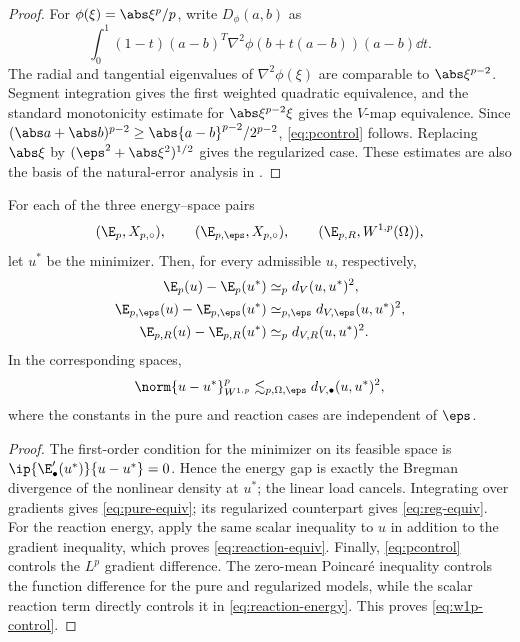 \begin{proof}
For \(\phi(\xi)=\abs\xi^p/p\), write \(D_\phi(a,b)\) as
\[
 \int_0^1(1-t)(a-b)^T\nabla^2\phi(b+t(a-b))(a-b)\dd t.
\]
The radial and tangential eigenvalues of \(\nabla^2\phi(\xi)\) are comparable to
\(\abs\xi^{p-2}\). Segment integration gives the first weighted quadratic equivalence, and the standard
monotonicity estimate for \(\abs\xi^{p-2}\xi\) gives the \(V\)-map equivalence. Since
\((\abs a+\abs b)^{p-2}\geq\abs{a-b}^{p-2}/2^{p-2}\), \cref{eq:pcontrol} follows. Replacing
\(\abs\xi\) by \((\eps^2+\abs\xi^2)^{1/2}\) gives the regularized case. These estimates are also the
basis of the natural-error analysis in \cite{BarrettLiu1993,DieningKreuzer2008}.
\end{proof}

\begin{theorem}
\label{thm:energy-v}
For each of the three energy--space pairs
\[
 (\E_p,X_{p,\circ}),\qquad(\E_{p,\eps},X_{p,\circ}),\qquad
 (\E_{p,R},W^{1,p}(\Omega)),
\]
let \(u^*\) be the minimizer. Then, for every admissible \(u\), respectively,
\begin{align}
 \E_p(u)-\E_p(u^*)&\simeq_p d_V(u,u^*)^2,
 \label{eq:pure-equiv}\\
 \E_{p,\eps}(u)-\E_{p,\eps}(u^*)&\simeq_{p,\eps}d_{V,\eps}(u,u^*)^2,
 \label{eq:reg-equiv}\\
 \E_{p,R}(u)-\E_{p,R}(u^*)&\simeq_p d_{V,R}(u,u^*)^2.
 \label{eq:reaction-equiv}
\end{align}
In the corresponding spaces,
\begin{equation}
 \norm{u-u^*}_{W^{1,p}}^p
 \lesssim_{p,\Omega,\eps}d_{V,\bullet}(u,u^*)^2,
 \label{eq:w1p-control}
\end{equation}
where the constants in the pure and reaction cases are independent of \(\eps\).
\end{theorem}

\begin{proof}
The first-order condition for the minimizer on its feasible space is
\(\ip{\E_\bullet'(u^*)}{u-u^*}=0\). Hence the energy gap is exactly the Bregman divergence of the
nonlinear density at \(u^*\); the linear load cancels. Integrating  over gradients
gives \cref{eq:pure-equiv}; its regularized counterpart gives \cref{eq:reg-equiv}. For the reaction
energy, apply the same scalar inequality to \(u\) in addition to the gradient inequality, which proves
\cref{eq:reaction-equiv}. Finally, \cref{eq:pcontrol} controls the \(L^p\) gradient difference. The
zero-mean Poincar\'e inequality controls the function difference for the pure and regularized models,
while the scalar reaction term directly controls it in \cref{eq:reaction-energy}. This proves
\cref{eq:w1p-control}.
\end{proof}

